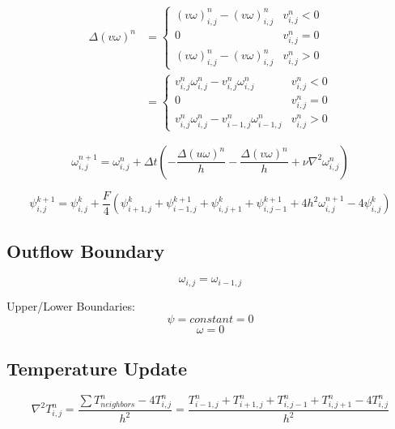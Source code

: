 \begin{equation}
    \begin{split}
    \Delta (v \omega)^n  & = \begin{cases} 
          (v\omega)_{i, j}^{n} - (v\omega)_{i, j}^{n} & v_{i, j}^n < 0 \\
          0 & v_{i, j}^n = 0 \\
          (v\omega)_{i, j}^{n} - (v\omega)_{i, j}^{n} & v_{i, j}^n > 0 
       \end{cases} \\
        & = \begin{cases} 
              v_{i, j}^{n}\omega_{i, j}^{n} - v_{i, j}^{n}\omega_{i, j}^{n} & v_{i, j}^n < 0 \\
              0 & v_{i, j}^n = 0 \\
              v_{i, j}^{n}\omega_{i, j}^{n} - v_{i - 1, j}^{n}\omega_{i - 1, j}^{n} & v_{i, j}^n > 0 
           \end{cases}
    \end{split}
\end{equation}


\begin{equation}
    \omega_{i, j}^{n + 1} = \omega_{i, j}^{n} + \Delta t \left( -\frac{\Delta(u \omega)^n}{h} - \frac{\Delta(v \omega) ^n}{h} + \nu \nabla^2\omega_{i, j}^{n} \right)
\end{equation}

\begin{equation}
    \psi_{i, j}^{k + 1} =  \psi_{i, j}^{k} + \frac{F}{4} \left( \psi_{i + 1, j}^{k} + \psi_{i - 1, j}^{k + 1} + \psi_{i, j + 1}^{k} + \psi_{i, j - 1}^{k + 1} + 4 h^2 \omega_{i, j}^{n + 1} - 4\psi_{i, j}^{k} \right)
\end{equation}

\subsection{Outflow Boundary}
\begin{equation}
    \omega_{i, j} = \omega_{i - 1, j}
\end{equation}

Upper/Lower Boundaries: 
\begin{equation}
    \psi = constant = 0
\end{equation}
\begin{equation}
    \omega = 0
\end{equation}


\subsection{Temperature Update}
\begin{equation}
    \nabla^2 T_{i, j}^{n} = \frac{\sum T_{neighbors}^{n} - 4 T_{i, j}^{n}}{h^2} = \frac{T_{i - 1, j}^{n} + T_{i + 1, j}^{n} + T_{i, j - 1}^{n} + T_{i, j + 1}^{n} - 4 T_{i, j}^{n}}{h^2}
\end{equation}


